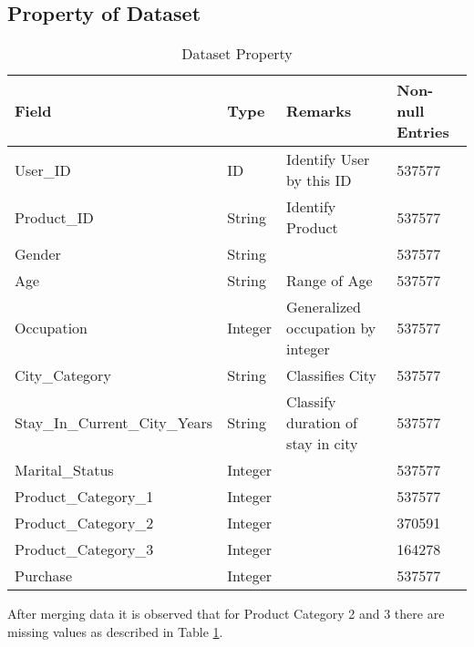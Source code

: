 \documentclass[paper=letter, fontsize=12pt]{article}
\begin{document}
\subsection{Property of Dataset}
\begin{table}[H]
	\centering
	\begin{tabular}{l  l  l  l}
		Field & Type & Remarks & Non-null Entries
		\\ \hline \hline
		User\_ID & ID & Identify User by this ID & 537577
		\\
		Product\_ID & String & Identify Product & 537577
		\\
		Gender & String &  & 537577
		\\
		Age & String & Range of Age & 537577
		\\
		Occupation & Integer & Generalized occupation by integer & 537577
		\\
		City\_Category & String & Classifies City & 537577
		\\
		Stay\_In\_Current\_City\_Years & String & Classify duration of stay in city & 537577
		\\
		Marital\_Status & Integer &  & 537577
		\\
		Product\_Category\_1 & Integer &  & 537577
		\\
		Product\_Category\_2 & Integer &  & 370591
		\\
		Product\_Category\_3 & Integer &  & 164278
		\\
		Purchase & Integer &  & 537577
	\end{tabular}
    \caption{Dataset Property}
    \label{table:data-observation}
\end{table}

After merging data it is observed that for Product Category 2 and 3 there are missing values as described in Table \ref{table:data-observation}.
\end{document}
